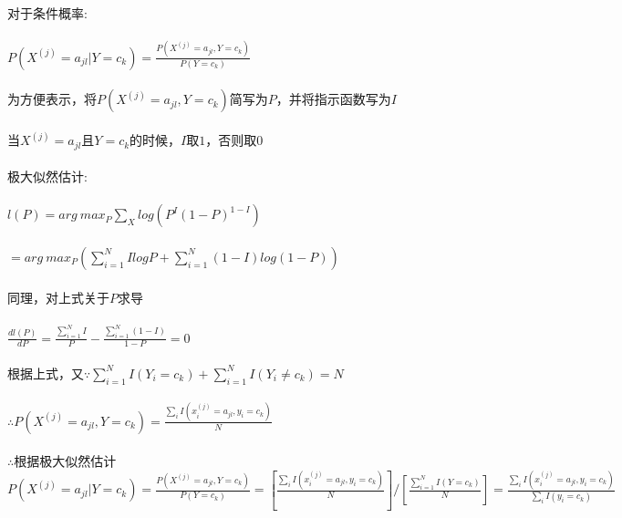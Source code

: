 \documentclass[]{article}
\begin{document}
对于条件概率:\\\\
$P(X^{(j)}=a_{jl}|Y=c_k)=\frac{P(X^{(j)}=a_{jl},Y=c_k)}{P(Y=c_k)}$\\\\
为方便表示，将$P(X^{(j)}=a_{jl},Y=c_k)$简写为$P$，并将指示函数写为$I$\\\\
当$X^{(j)}=a_{jl}$且$Y=c_k$的时候，$I$取$1$，否则取$0$\\\\
极大似然估计:\\\\
$l(P)=arg\ max_{P}\sum_{X}log(P^I(1-P)^{1-I})$\\\\
$=arg\ max_{P}(\sum_{i=1}^{N}IlogP+\sum_{i=1}^{N}(1-I)log(1-P))$\\\\
同理，对上式关于$P$求导\\\\
$\frac{dl(P)}{dP}=\frac{\sum_{i=1}^{N}I}{P}-\frac{\sum_{i=1}^{N}(1-I)}{1-P}=0$\\\\
根据上式，又$\because \sum_{i=1}^{N}I(Y_i=c_k)+\sum_{i=1}^{N}I(Y_i\neq c_k)=N$\\\\
$\therefore P(X^{(j)}=a_{jl},Y=c_k)=\frac{\sum_iI(x_i^{(j)}=a_{jl},y_i=c_k)}{N}$\\\\
$\therefore$根据极大似然估计$P(X^{(j)}=a_{jl}|Y=c_k)=\frac{P(X^{(j)}=a_{jl},Y=c_k)}{P(Y=c_k)}=[\frac{\sum_iI(x_i^{(j)}=a_{jl},y_i=c_k)}{N}]/ [\frac{\sum_{i=1}^{N}I(Y=c_k)}{N}]=\frac{\sum_iI(x_i^{(j)}=a_{jl},y_i=c_k)}{\sum_iI(y_i=c_k)}$\\\\
\end{document}

